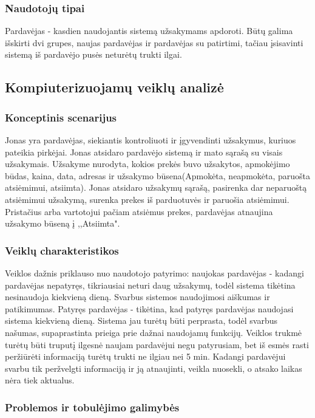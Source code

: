\documentclass[oneside]{VUMIFPSkursinis}
\begin{document}
		\subsubsection{Naudotojų tipai}
			Pardavėjas - kasdien naudojantis sistemą užsakymams apdoroti. Būtų galima išskirti dvi grupes, naujas pardavėjas ir pardavėjas su patirtimi, tačiau įsisavinti sistemą iš pardavėjo pusės neturėtų trukti ilgai.
	\subsection{Kompiuterizuojamų veiklų analizė}
		\subsubsection{Konceptinis scenarijus}
			Jonas yra pardavėjas, siekiantis kontroliuoti ir įgyvendinti užsakymus, kuriuos pateikia pirkėjai. Jonas atsidaro pardavėjo sistemą ir mato sąrašą su visais užsakymais. Užsakyme nurodyta, kokios prekės buvo užsakytos, apmokėjimo būdas, kaina, data, adresas ir užsakymo būsena(Apmokėta, neapmokėta, paruošta atsiėmimui, atsiimta). Jonas atsidaro užsakymų sąrašą, pasirenka dar neparuoštą atsiėmimui užsakymą, surenka prekes iš parduotuvės ir paruošia atsiėmimui. Pristačius arba vartotojui pačiam atsiėmus prekes, pardavėjas atnaujina užsakymo būseną į ,,Atsiimta".

		\subsubsection{Veiklų charakteristikos}
			Veiklos dažnis priklauso nuo naudotojo patyrimo: naujokas pardavėjas - kadangi pardavėjas nepatyręs, tikriausiai neturi daug užsakymų, todėl sistema tikėtina nesinaudoja kiekvieną dieną. Svarbus sistemos naudojimosi aiškumas ir patikimumas. Patyręs pardavėjas - tikėtina, kad patyręs pardavėjas naudojasi sistema kiekvieną dieną. Sistema jau turėtų būti perprasta, todėl svarbus našumas, supaprastinta prieiga prie dažnai naudojamų funkcijų.
			Veiklos trukmė turėtų būti truputį ilgesnė naujam pardavėjui negu patyrusiam, bet iš esmės rasti peržiūrėti informaciją turėtų trukti ne ilgiau nei 5 min.
			Kadangi pardavėjui svarbu tik peržvelgti informaciją ir ją atnaujinti, veikla nuosekli, o atsako laikas nėra tiek aktualus.

		\subsubsection{Problemos ir tobulėjimo galimybės}
\end{document}
